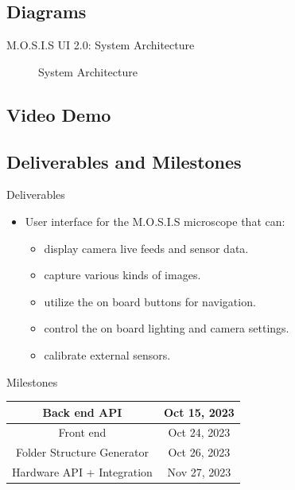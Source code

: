 \documentclass[17pt, aspectratio=169]{beamer}
\begin{document}
\subsection*{Diagrams}\begin{frame}{M.O.S.I.S UI 2.0: System Architecture}
	\begin{figure}
		\caption{System Architecture}
	\end{figure}
\end{frame}
\subsection{Video Demo}
\subsection*{Deliverables and Milestones}
\begin{frame}{Deliverables}
	\begin{itemize}
		\item User interface for the M.O.S.I.S microscope that can:
		      \begin{itemize}
			      \item display camera live feeds and sensor data.
			      \item capture various kinds of images.
			      \item utilize the on board buttons for navigation.
			      \item control the on board lighting and camera settings.
			      \item calibrate external sensors.
		      \end{itemize}
	\end{itemize}
\end{frame}
\begin{frame}{Milestones}
	\begin{center}
		\begin{tabular}{||c | c||}
			\hline
			Back end API               & Oct 15, 2023 \\
			\hline
			Front end                  & Oct 24, 2023 \\
			\hline
			Folder Structure Generator & Oct 26, 2023 \\
			\hline
			Hardware API + Integration & Nov 27, 2023 \\
			\hline
		\end{tabular}
	\end{center}
\end{frame}
\end{document}

